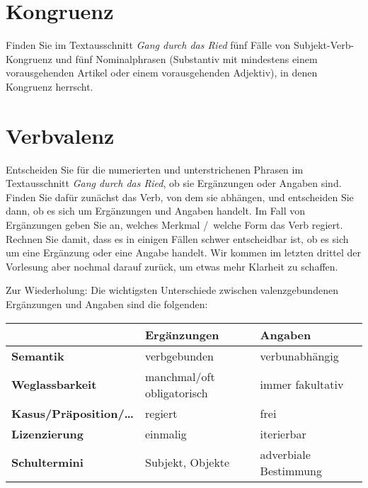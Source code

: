 \section{Kongruenz}

Finden Sie im Textausschnitt \textit{Gang durch das Ried} fünf Fälle von Subjekt-Verb-Kongruenz und fünf Nominalphrasen (Substantiv mit mindestens einem vorausgehenden Artikel oder einem vorausgehenden Adjektiv), in denen Kongruenz herrscht.




\section{Verbvalenz}

Entscheiden Sie für die numerierten und unterstrichenen Phrasen im Textausschnitt \textit{Gang durch das Ried}, ob sie Ergänzungen oder Angaben sind.
Finden Sie dafür zunächst das Verb, von dem sie abhängen, und entscheiden Sie dann, ob es sich um Ergänzungen und Angaben handelt.
Im Fall von Ergänzungen geben Sie an, welches Merkmal \slash\ welche Form das Verb regiert.
Rechnen Sie damit, dass es in einigen Fällen schwer entscheidbar ist, ob es sich um eine Ergänzung oder eine Angabe handelt.
Wir kommen im letzten drittel der Vorlesung aber nochmal darauf zurück, um etwas mehr Klarheit zu schaffen.


Zur Wiederholung: Die wichtigsten Unterschiede zwischen valenzgebundenen Ergänzungen und Angaben sind die folgenden:

\Zeile

\begin{center}
  \begin{tabular}[h]{lll}
    \toprule
                         & \textbf{Ergänzungen} & \textbf{Angaben} \\
    \midrule
    \textbf{Semantik} & verbgebunden & verbunabhängig \\
    \textbf{Weglassbarkeit} & manchmal\slash oft obligatorisch & immer fakultativ \\
    \textbf{Kasus\slash Präposition\slash\ldots} & regiert & frei \\
    \textbf{Lizenzierung} & einmalig & iterierbar \\
    \midrule
    \textbf{Schultermini} & Subjekt, Objekte & adverbiale Bestimmung \\
    \bottomrule
  \end{tabular}
\end{center}

\newpage

